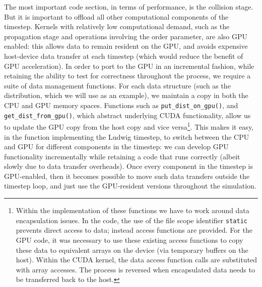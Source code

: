 The most important code section, in terms of performance, is the
collision stage. But it is important to offload all other
computational components of the timestep. Kernels with relatively low
computational demand, such as the propagation stage and operations
involving the order parameter, are also GPU enabled: this allows data
to remain resident on the GPU, and avoids expensive host-device data
transfer at each timestep (which would reduce the benefit of GPU
acceleration).  In order to port to the GPU in an incremental fashion,
while retaining the ability to test for correctness throughout the
process, we require a suite of data management functions. For each
data structure (such as the distribution, which we will use as an
example), we maintain a copy in both the CPU and GPU memory spaces.
Functions such as \verb+put_dist_on_gpu()+, and
\verb+get_dist_from_gpu()+, which abstract underlying CUDA
functionality, allow us to update the GPU copy from the host copy and
vice versa\footnote {Within the implementation of these functions we
  have to work around data encapsulation issues. In the code, the use
  of the file scope identifier \texttt{static} prevents direct access
  to data; instead access functions are provided.  For the GPU code,
  it was necessary to use these existing access functions to copy
  these data to equivalent arrays on the device (via temporary buffers
  on the host).  Within the CUDA kernel, the data access function
  calls are substituted with array accesses.  The process is reversed
  when encapsulated data needs to be transferred back to the host.}.
This makes it easy, in the function implementing the Ludwig timestep,
to switch between the CPU and GPU for different components in the
timestep: we can develop GPU functionality incrementally while
retaining a code that runs correctly (albeit slowly due to data
transfer overheads).  Once every component in the timestep is
GPU-enabled, then it becomes possible to move such data transfers
outside the timestep loop, and just use the GPU-resident versions
throughout the simulation.

